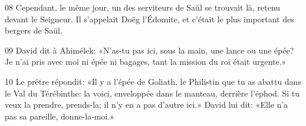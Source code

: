 

08 Cependant, le même jour, un des serviteurs de Saül se trouvait là, retenu devant le Seigneur. Il s’appelait Doëg l’Édomite, et c’était le plus important des bergers de Saül.

09 David dit à Ahimélek: «N’as-tu pas ici, sous la main, une lance ou une épée? Je n’ai pris avec moi ni épée ni bagages, tant la mission du roi était urgente.»

10 Le prêtre répondit: «Il y a l’épée de Goliath, le Philistin que tu as abattu dans le Val du Térébinthe: la voici, enveloppée dans le manteau, derrière l’éphod. Si tu veux la prendre, prends-la; il n’y en a pas d’autre ici.» David lui dit: «Elle n’a pas sa pareille, donne-la-moi.»

